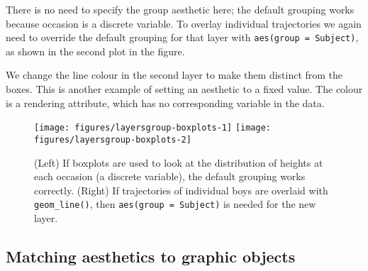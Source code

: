 \noindent There is no need to specify the group aesthetic here; the
default grouping works because occasion is a discrete variable. To
overlay individual trajectories we again need to override the default
grouping for that layer with \texttt{aes(group = Subject)}, as shown in
the second plot in the figure.

\begin{Shaded}
\begin{Highlighting}[]
\StringTok{ }\NormalTok{(}\NormalTok{(}  \NormalTok{)}
\end{Highlighting}
\end{Shaded}

We change the line colour in the second layer to make them distinct from
the boxes. This is another example of setting an aesthetic to a fixed
value. The colour is a rendering attribute, which has no corresponding
variable in the data. 

\begin{Shaded}
\begin{Highlighting}[]
\NormalTok{)}
\NormalTok{) +}
\StringTok{ }\NormalTok{(}\NormalTok{(} \NormalTok{)}
\end{Highlighting}
\end{Shaded}

\begin{figure}
\texttt{[image: figures/layersgroup-boxplots-1]} \texttt{[image: figures/layersgroup-boxplots-2]} \caption{(Left) If boxplots are used to look at the distribution of heights at each occasion (a discrete variable), the default grouping works correctly.  (Right) If trajectories of individual boys are overlaid with \texttt{geom\_line()}, then \texttt{aes(group = Subject)} is needed for the new layer.\label{fig:group-boxplots}}
\end{figure}

\subsection{Matching aesthetics to graphic objects}\label{sub:matching}

